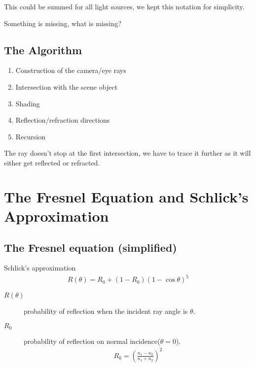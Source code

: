 \documentclass[10pt]{armath}
\numberwithin{equation}{section}
\newenvironment{Figure}
{\par\medskip\noindent\minipage{\linewidth}}
{\endminipage\par\medskip}
\theoremstyle{definition}
\begin{document}
\begin{multicols}{2}
  This could be summed for all light sources, we kept this notation for
  simplicity.

  Something is missing, what is missing?

  \subsection{The Algorithm}%
  \label{sub:the_algorithm}

  \begin{enumerate}
    \item Construction of the camera/eye rays
    \item Intersection with the scene object
    \item Shading
    \item Reflection/refraction directions
    \item Recursion
  \end{enumerate}

  The ray doesn't stop at the first intersection, we have to trace it further
  as it will either get reflected or refracted.

  \section{The Fresnel Equation and Schlick's Approximation}%
  \label{sec:the_fresnel_equation_and_schlick_s_approximation}

  \begin{Figure}
    \begin{center}
      
    \end{center}
    \label{fig:05_1}
  \end{Figure}

  \subsection{The Fresnel equation (simplified)}%
  \label{sub:the_fresnel_equation_simplified_}

  Schlick's approximation
  \begin{align*}
    R(\theta)=R_0+\left(1-R_0\right){\left(1-\cos\theta\right)}^5
  \end{align*}
  \begin{description}
    \item[$R(\theta)$] probability of reflection when the incident ray angle is
      $\theta$.
    \item[$R_0$] probability of reflection on normal incidence($\theta=0$).
      \begin{align*}
        R_0={\left(\frac{n_1-n_2}{n_1+n_2}\right)}^2
      \end{align*}
  \end{description}


\end{multicols}
\end{document}
